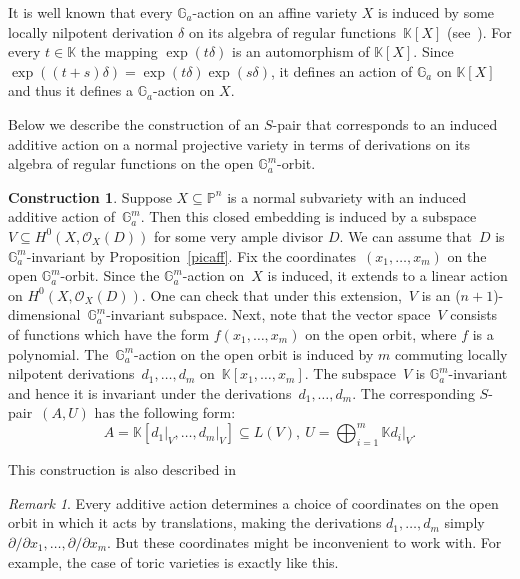 \documentclass[a4paper,draft,reqno,12pt]{amsart}
\theoremstyle{definition}
\theoremstyle{definition}
\newtheorem{construction}{Construction}
\theoremstyle{remark}
\newtheorem {remark}{Remark}
\def\BG{{\mathbb G}}
\def\BK{{\mathbb K}}
\def\BG{{\mathbb G}}
\def\BK{{\mathbb K}}
\def\BP{{\mathbb P}}
\def\CO{\mathcal{O}}
\begin{document}
It is well known that every $\BG_a$-action on an affine variety $X$ is induced by some locally nilpotent derivation $\delta$ on its algebra of regular functions~$\BK[X]$ (see~\cite[Section 1.5.1]{FR}). For every $t\in\BK$ the mapping $\exp{(t\delta)}$ is an automorphism of $\BK[X]$. Since $\exp((t+s)\delta) = \exp{(t\delta)}\exp{(s\delta)}$, it defines an action of $\BG_a$ on $\BK[X]$ and thus it defines a $\BG_a$-action on $X$.

Below we describe the construction of an $S$-pair that corresponds to an induced additive action on a normal projective variety in terms of derivations on its algebra of regular functions on the open $\BG_a^m$-orbit.

\begin{construction}\label{dersalgebra}
    Suppose $X \subseteq \BP^n$ is a normal subvariety with an induced additive action of~$\BG_a^m$. Then this closed embedding is induced by a subspace $V\subseteq H^0(X, \CO_X(D))$ for some very ample divisor $D$. We can assume that~$D$ is~$\BG_a^m$-invariant by Proposition~\ref{picaff}. Fix the coordinates~$(x_1,\dotsc,x_m)$ on the open $\BG_a^m$-orbit. Since the $\BG_a^m$-action on~$X$ is induced, it extends to a linear action on $H^0(X, \CO_X(D))$. One can check that under this extension,~$V$ is an ($n+1$)-dimensional~$\BG_a^m$-invariant subspace. Next, note that the vector space~$V$ consists of functions which have the form $f(x_1,\dotsc,x_m)$ on the open orbit, where $f$ is a polynomial. The~$\BG_a^m$-action on the open orbit is induced by $m$ commuting locally nilpotent derivations~$d_1,\dotsc,d_m$ on~$\BK[x_1,\dotsc,x_m]$. The subspace~$V$ is $\BG_a^m$-invariant and hence it is invariant under the derivations~$d_1,\dotsc,d_m$. The corresponding $S$-pair~$(A,U)$ has the following form: \begin{equation}
        A = \BK[d_1\big|_V,\dotsc,d_m\big|_V] \subseteq L(V), \ U = \bigoplus_{i=1}^m\BK d_i\big|_V.
    \end{equation}
\end{construction}

This construction is also described in~\cite[Theorem 2.6]{AZ}

\begin{remark}
    Every additive action determines a choice of coordinates on the open orbit in which it acts by translations, making the derivations $d_1,\dotsc,d_m$ simply $\partial/\partial x_1,\dotsc,\partial/\partial x_m$. But these coordinates might be inconvenient to work with. For example, the case of toric varieties is exactly like this.
\end{remark}
\end{document}
